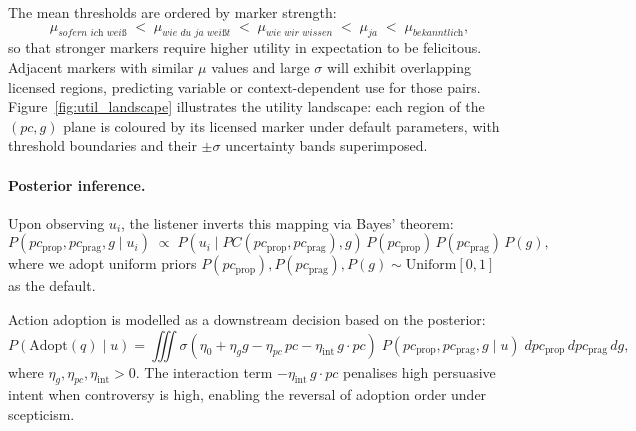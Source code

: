 \documentclass[12pt]{article}
\begin{document}

The mean thresholds are ordered by marker strength:
\[
\mu_{\textit{sofern ich weiß}}
\;<\;
\mu_{\textit{wie du ja weißt}}
\;<\;
\mu_{\textit{wie wir wissen}}
\;<\;
\mu_{\textit{ja}}
\;<\;
\mu_{\textit{bekanntlich}},
\]
so that stronger markers require higher utility in expectation to be felicitous. Adjacent markers with similar $\mu$ values and large $\sigma$ will exhibit overlapping licensed regions, predicting variable or context-dependent use for those pairs. Figure~\ref{fig:util_landscape} illustrates the utility landscape: each region of the $(pc, g)$ plane is coloured by its licensed marker under default parameters, with threshold boundaries and their $\pm\sigma$ uncertainty bands superimposed.

\paragraph{Posterior inference.}
Upon observing $u_i$, the listener inverts this mapping via Bayes' theorem:
\begin{equation}
P(pc_{\text{prop}}, pc_{\text{prag}}, g \mid u_i)
\;\propto\;
P(u_i \mid PC(pc_{\text{prop}}, pc_{\text{prag}}), g)\,
P(pc_{\text{prop}})\,P(pc_{\text{prag}})\,P(g),
\label{eq:posterior}
\end{equation}
where we adopt uniform priors $P(pc_{\text{prop}}), P(pc_{\text{prag}}), P(g) \sim \mathrm{Uniform}[0,1]$ as the default.

Action adoption is modelled as a downstream decision based on the posterior:
\begin{equation}
P(\mathrm{Adopt}(q) \mid u)
= \iiint
\sigma(\eta_0 + \eta_g g - \eta_{pc}\, pc - \eta_{\mathrm{int}}\, g \cdot pc)
\; P(pc_{\mathrm{prop}}, pc_{\mathrm{prag}}, g \mid u)
\; dpc_{\mathrm{prop}}\, dpc_{\mathrm{prag}}\, dg,
\label{eq:adoption}
\end{equation}
where $\eta_g, \eta_{pc}, \eta_{\mathrm{int}} > 0$. The interaction term $-\eta_{\mathrm{int}}\, g \cdot pc$ penalises high persuasive intent when controversy is high, enabling the reversal of adoption order under scepticism.
\end{document}
